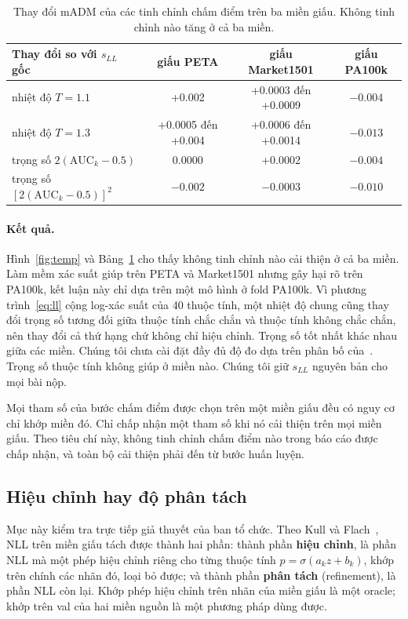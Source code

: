 \documentclass[11pt,a4paper]{article}
\begin{document}
\begin{table}[H]
\centering\small
\begin{tabular}{@{}lccc@{}}
\toprule
Thay đổi so với $s_{LL}$ gốc & giấu PETA & giấu Market1501 & giấu PA100k \\
\midrule
nhiệt độ $T=1.1$ & +0.002 & +0.0003 đến +0.0009 & $-0.004$ \\
nhiệt độ $T=1.3$ & +0.0005 đến +0.004 & +0.0006 đến +0.0014 & $-0.013$ \\
trọng số $2(\mathrm{AUC}_k-0.5)$ & 0.0000 & +0.0002 & $-0.004$ \\
trọng số $[2(\mathrm{AUC}_k-0.5)]^2$ & $-0.002$ & $-0.0003$ & $-0.010$ \\
\bottomrule
\end{tabular}
\caption{Thay đổi mADM của các tinh chỉnh chấm điểm trên ba miền giấu. Không tinh chỉnh nào tăng ở cả ba miền.}
\label{tab:robust}
\end{table}

\paragraph{Kết quả.} Hình~\ref{fig:temp} và Bảng~\ref{tab:robust} cho thấy không tinh chỉnh nào cải thiện ở cả ba miền. Làm mềm xác suất giúp trên PETA và Market1501 nhưng gây hại rõ trên PA100k, kết luận này chỉ dựa trên một mô hình ở fold PA100k. Vì phương trình~\eqref{eq:ll} cộng log-xác suất của 40 thuộc tính, một nhiệt độ chung cũng thay đổi trọng số tương đối giữa thuộc tính chắc chắn và thuộc tính không chắc chắn, nên thay đổi cả thứ hạng chứ không chỉ hiệu chỉnh. Trọng số tốt nhất khác nhau giữa các miền. Chúng tôi chưa cài đặt đầy đủ độ đo dựa trên phân bố của~\cite{specker21}. Trọng số thuộc tính không giúp ở miền nào. Chúng tôi giữ $s_{LL}$ nguyên bản cho mọi bài nộp.

\begin{ghichu}
Mọi tham số của bước chấm điểm được chọn trên một miền giấu đều có nguy cơ chỉ khớp miền đó. Chỉ chấp nhận một tham số khi nó cải thiện trên mọi miền giấu. Theo tiêu chí này, không tinh chỉnh chấm điểm nào trong báo cáo được chấp nhận, và toàn bộ cải thiện phải đến từ bước huấn luyện.
\end{ghichu}

\subsection{Hiệu chỉnh hay độ phân tách}
\label{sec:calib}

Mục này kiểm tra trực tiếp giả thuyết của ban tổ chức. Theo Kull và Flach~\cite{kull}, NLL trên miền giấu tách được thành hai phần: thành phần \textbf{hiệu chỉnh}, là phần NLL mà một phép hiệu chỉnh riêng cho từng thuộc tính $p=\sigma(a_kz+b_k)$, khớp trên chính các nhãn đó, loại bỏ được; và thành phần \textbf{phân tách} (refinement), là phần NLL còn lại. Khớp phép hiệu chỉnh trên nhãn của miền giấu là một oracle; khớp trên val của hai miền nguồn là một phương pháp dùng được.
\end{document}
